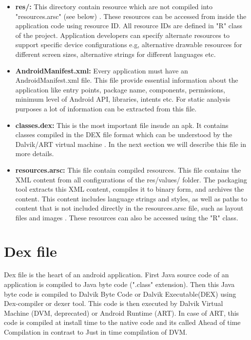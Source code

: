 \documentclass[../main.tex]{subfile}
\begin{document}
\begin{itemize}
			\item \textbf{res/:} This directory contain resource which are not compiled into "resources.arsc" (see below) \cite{APK_structure}. These resources can be accessed from inside the application code using resource ID. All resource IDs are defined in "R" class of the project. Application developers can specify alternate resources to support specific device configurations e.g, alternative drawable resources for different screen sizes, alternative strings for different languages etc.
			
			\item \textbf{AndroidManifest.xml:} Every application must have an AndroidManifest.xml file. This file provide essential information about the application like entry points, package name, components, permissions, minimum level of Android API, libraries, intents etc. For static analysis purposes a lot of information can be extracted from this file.
			
			\item \textbf{classes.dex:} This is the most important file insude an apk. It contains classes compiled in the DEX file format which can be understood by the Dalvik/ART virtual machine \cite{APK_structure}. In the next section we will describe this file in more details.
			
			\item \textbf{resources.arsc:} This file contain compiled resources. This file contains the XML content from all configurations of the res/values/ folder. The packaging tool extracts this XML content, compiles it to binary form, and archives the content. This content includes language strings and styles, as well as paths to content that is not included directly in the resources.arsc file, such as layout files and images \cite{APK_structure}. These resources can also be accessed using the "R" class.
		\end{itemize}
		

	\section{Dex file}\label{sec:dex}
		\paragraph{} Dex file is the heart of an android application. First Java source code of an application is compiled to Java byte code (".class" extension). Then this Java byte code is compiled to Dalvik Byte Code or Dalvik Executable(DEX) using Dex-compiler or dexer tool. This code is then executed by Dalvik Virtual Machine (DVM, deprecated) or Android Runtime (ART). In case of ART, this code is compiled at install time to the native code and its called Ahead of time Compilation in contrast to Just in time compilation of DVM.
\end{document}
